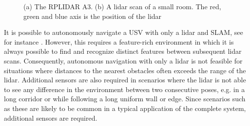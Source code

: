 \begin{figure}[h!]
    \centering
	\caption[The RPLIDAR A3]{(a) The RPLIDAR A3. (b) A lidar scan of a small room. The red, green and blue axis is the position of the lidar} \label{fig:lidar_sensor}
\end{figure}

It is possible to autonomously navigate a USV with only a lidar and SLAM, see for instance \citet{Ueland2016}. However, this requires a feature-rich environment in which it is always possible to find and recognize distinct features between subsequent lidar scans. Consequently, autonomous navigation with only a lidar is not feasible for situations where distances to the nearest obstacles often exceeds the range of the lidar. Additional sensors are also required in scenarios where the lidar is not able to see any difference in the environment between two consecutive poses, e.g. in a long corridor or while following a long uniform wall or edge. Since scenarios such as these are likely to be common in a typical application of the complete system, additional sensors are required.

